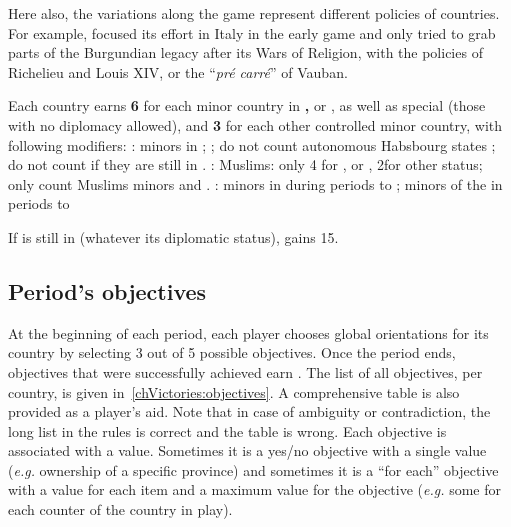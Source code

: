 \begin{designnote}
  Here also, the variations along the game represent different
  policies of countries. For example, \FRA focused its effort in Italy
  in the early game and only tried to grab parts of the Burgundian
  legacy after its Wars of Religion, with the policies of Richelieu
  and Louis XIV, or the ``\emph{pré carré}'' of Vauban.
\end{designnote}

\bparag Each country earns {\bf 6 \VPs} for each minor country in {\bf
  \VASSAL, \ANNEXION} or {\bf \dipAT}, as well as special \EW (those
with no diplomacy allowed), and {\bf 3 \VPs} for each other controlled
minor country, with following modifiers:
\bparag \HIS: minors in \regionItalie {}; \paysChevaliers
{} ; do not count autonomous Habsbourg states ; do not count
\paysChevaliers if they are still in \provinceRhodos.
\bparag \TUR: Muslims: only 4 \VPs for \VASSAL, \ANNEXION or \dipAT, 2\VPs for
other status; only count Muslims minors and \paysTransylvanie.
\bparag \FRA: minors in \regionItalie {} during periods
 to  ; minors of the \HRE {} in periods
 to 

\aparag[Special]
\bparag If \paysChevaliers is still in \provinceRhodos (whatever its
diplomatic status), \HIS gains 15\VPs.

\subsection{Period's objectives}
\aparag[Overview]
\bparag At the beginning of each period, each player chooses global
orientations for its country by selecting 3 out of 5 possible objectives.
\bparag Once the period ends, objectives that were successfully achieved earn
\VPs.
\bparag The list of all objectives, per country, is given
in~\ref{chVictories:objectives}. A comprehensive table is also provided as a
player's aid. Note that in case of ambiguity or contradiction, the long list
in the rules is correct and the table is wrong.
\bparag Each objective is associated with a \VPs value. Sometimes it is a
yes/no objective with a single value (\emph{e.g.} ownership of a specific
province) and sometimes it is a ``for each'' objective with a value for each
item and a maximum value for the objective (\emph{e.g.} some \VPs for each
\TradeFLEET counter of the country in play).


